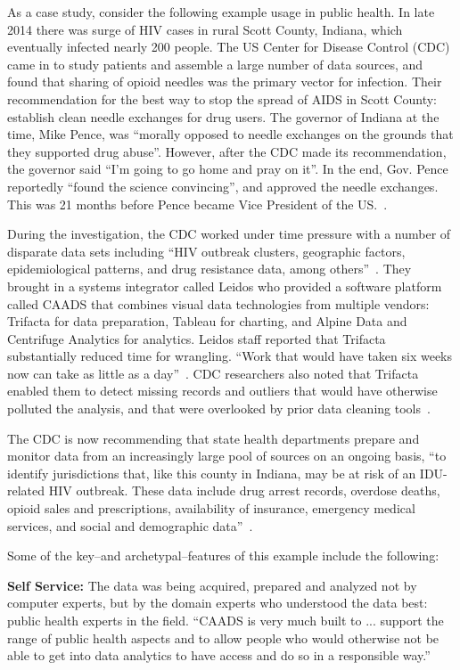 \documentclass[11pt]{article}
\newcommand{\smallitem}[1]{\vspace{0.3em}\noindent\textbf{#1}}
\begin{document}
As a case study, consider the following example usage in public health. In late 2014 there was surge of HIV cases in rural Scott County, Indiana, which eventually infected nearly 200 people. The US Center for Disease Control (CDC) came in to study patients and assemble a large number of data sources, and found that sharing of opioid needles was the primary vector for infection. Their recommendation for the best way to stop the spread of AIDS in Scott County: establish clean needle exchanges for drug users.  The governor of Indiana at the time, Mike Pence, was ``morally opposed to needle exchanges on the grounds that they supported drug abuse''. However, after the CDC made its recommendation, the governor said ``I'm going to go home and pray on it''. In the end, Gov. Pence reportedly ``found the science convincing'', and approved the needle exchanges. This was 21 months before Pence became Vice President of the US.~\cite{nyt}.

During the investigation, the CDC worked under time pressure with a number of disparate data sets including ``HIV outbreak clusters, geographic factors, epidemiological patterns, and drug resistance data, among others''~\cite{datanami}. They brought in a systems integrator called Leidos who provided a software platform called CAADS that combines visual data technologies from multiple vendors: Trifacta for data preparation, Tableau for charting, and Alpine Data and Centrifuge Analytics for analytics. Leidos staff reported that Trifacta substantially reduced time for wrangling. ``Work that would have taken six weeks now can take as little as a day''~\cite{ravi}. CDC researchers also noted that Trifacta enabled them to detect missing records and outliers that would have otherwise polluted the analysis, and that were overlooked by prior data cleaning tools~\cite{leidos}.

The CDC is now recommending that state health departments prepare and monitor data from an increasingly large pool of sources on an ongoing basis, ``to identify jurisdictions that, like this county in Indiana, may be at risk of an IDU-related HIV outbreak.  These data include drug arrest records, overdose deaths, opioid sales and prescriptions, availability of insurance, emergency medical services, and social and demographic data''~\cite{cdc}.

Some of the key--and archetypal--features of this example include the following:

    \smallitem{Self Service:} The data was being acquired, prepared and analyzed not by computer experts, but by the domain experts who understood the data best: public health experts in the field. ``CAADS is very much built to ... support the range of public health aspects and to allow people who would otherwise not be able to get into data analytics to have access and do so in a responsible way.''~\cite{datanami} 
    
\end{document}
